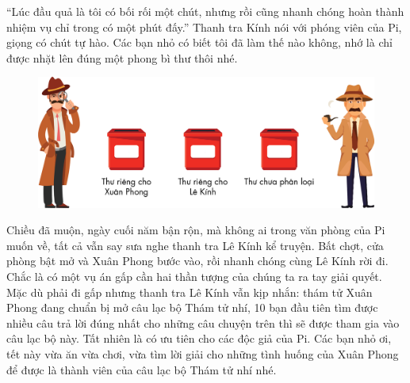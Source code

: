 	\vskip 0.1cm
	“Lúc đầu quả là tôi có bối rối một chút, nhưng rồi cũng nhanh chóng hoàn thành nhiệm vụ chỉ trong có một phút đấy.” Thanh tra Kính nói với phóng viên của Pi, giọng có chút tự hào.
	\vskip 0.1cm
	Các bạn nhỏ có biết tôi đã làm thế nào không, nhớ là chỉ được nhặt lên đúng một phong bì thư thôi nhé.
		\begin{figure}[H]
			\centering
			\vspace*{-5pt}
			\captionsetup{labelformat= empty, justification=centering}
			\includegraphics[width=1\linewidth]{5}
			\vspace*{-15pt}
		\end{figure}
	Chiều đã muộn, ngày cuối năm bận rộn, mà không ai trong văn phòng của Pi muốn về, tất cả vẫn say sưa nghe thanh tra Lê Kính kể truyện. Bất chợt, cửa phòng bật mở và Xuân Phong bước vào, rồi nhanh chóng cùng Lê Kính rời đi. Chắc là có một vụ án gấp cần hai thần tượng của chúng ta ra tay giải quyết. Mặc dù phải đi gấp nhưng thanh tra Lê Kính vẫn kịp nhắn: thám tử Xuân Phong đang chuẩn bị mở câu lạc bộ Thám tử nhí, 10 bạn đầu tiên tìm được nhiều câu trả lời đúng nhất cho những câu chuyện trên thì sẽ được tham gia vào câu lạc bộ này. Tất nhiên là có ưu tiên cho các độc giả của Pi. Các bạn nhỏ ơi, tết này vừa ăn vừa chơi, vừa tìm lời giải cho những tình huống của Xuân Phong để được là thành viên của câu lạc bộ Thám tử nhí nhé.
	